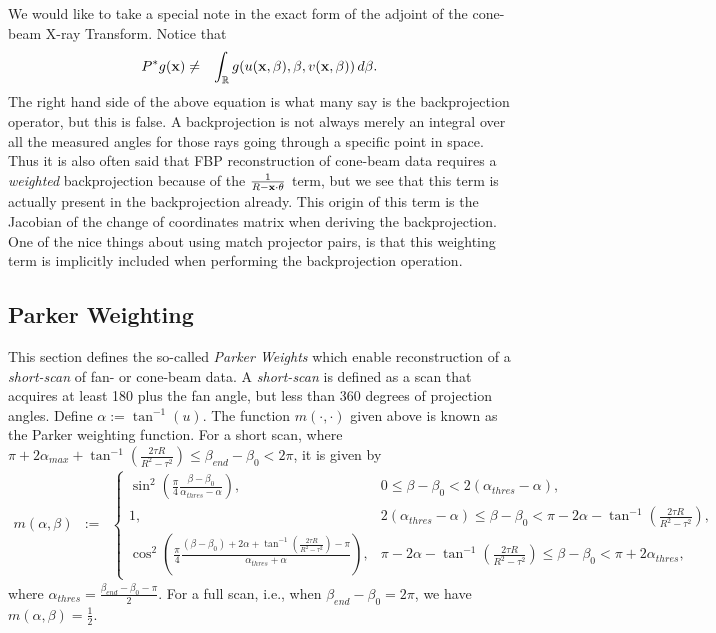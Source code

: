 \documentclass[11pt]{article}
\begin{document}
We would like to take a special note in the exact form of the adjoint of the cone-beam X-ray Transform.  Notice that
\begin{eqnarray*}
P^*g(\textbf{x}) &\neq& \int_\mathbb{R} g(u(\textbf{x},\beta), \beta, v(\textbf{x},\beta)) \, d\beta.
\end{eqnarray*}
The right hand side of the above equation is what many say is the backprojection operator, but this is false.  A backprojection is not always merely an integral over all the measured angles for those rays going through a specific point in space.  Thus it is also often said that FBP reconstruction of cone-beam data requires a \textit{weighted} backprojection because of the $\frac{1}{R-\textbf{x}\cdot\theta}$ term, but we see that this term is actually present in the backprojection already.  This origin of this term is the Jacobian of the change of coordinates matrix when deriving the backprojection.  One of the nice things about using match projector pairs, is that this weighting term is implicitly included when performing the backprojection operation.

\subsection{Parker Weighting} \label{sec:ParkerWeighting}

This section defines the so-called \textit{Parker Weights} \cite{Parker_MP_1982} which enable reconstruction of a \textit{short-scan} of fan- or cone-beam data.  A \textit{short-scan} is defined as a scan that acquires at least 180 plus the fan angle, but less than 360 degrees of projection angles. Define $\alpha := \tan^{-1}(u)$.  The function $m(\cdot, \cdot)$ given above is known as the Parker weighting function.  For a short scan, where $\pi + 2\alpha_{max} + \tan^{-1}\left(\frac{2\tau R}{R^2-\tau^2}\right) \leq \beta_{end}-\beta_0 < 2\pi$, it is given by
\begin{eqnarray*}
m(\alpha, \beta) &:=& \begin{cases} \sin^2\left( \frac{\pi}{4} \frac{\beta-\beta_0}{\alpha_{thres} - \alpha} \right), & 0 \leq \beta-\beta_0 < 2(\alpha_{thres}-\alpha), \\ 1, & 2(\alpha_{thres} - \alpha) \leq \beta-\beta_0 < \pi - 2\alpha - \tan^{-1}\left(\frac{2\tau R}{R^2-\tau^2}\right), \\ \cos^2\left( \frac{\pi}{4} \frac{(\beta-\beta_0) + 2\alpha + \tan^{-1}\left(\frac{2\tau R}{R^2-\tau^2}\right) - \pi}{\alpha_{thres}+\alpha} \right), & \pi-2\alpha-\tan^{-1}\left(\frac{2\tau R}{R^2-\tau^2}\right) \leq \beta-\beta_0 < \pi + 2\alpha_{thres}, \end{cases}
\end{eqnarray*}
where $\alpha_{thres} = \frac{\beta_{end}-\beta_0 - \pi}{2}$.  For a full scan, i.e., when $\beta_{end}-\beta_0 = 2\pi$, we have $m(\alpha, \beta) = \frac{1}{2}$.
\end{document}
